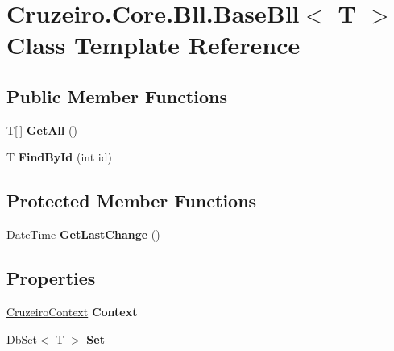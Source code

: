 \hypertarget{class_cruzeiro_1_1_core_1_1_bll_1_1_base_bll}{}\section{Cruzeiro.\+Core.\+Bll.\+Base\+Bll$<$ T $>$ Class Template Reference}
\label{class_cruzeiro_1_1_core_1_1_bll_1_1_base_bll}
\subsection*{Public Member Functions}
\begin{DoxyCompactItemize}
\item 
T\mbox{[}$\,$\mbox{]} {\bfseries Get\+All} ()\hypertarget{class_cruzeiro_1_1_core_1_1_bll_1_1_base_bll_aa5790d4f741afb0b0f5a05466eec2554}{}\label{class_cruzeiro_1_1_core_1_1_bll_1_1_base_bll_aa5790d4f741afb0b0f5a05466eec2554}

\item 
T {\bfseries Find\+By\+Id} (int id)\hypertarget{class_cruzeiro_1_1_core_1_1_bll_1_1_base_bll_ad104f483e8e7ceea014b4fabcae04562}{}\label{class_cruzeiro_1_1_core_1_1_bll_1_1_base_bll_ad104f483e8e7ceea014b4fabcae04562}

\end{DoxyCompactItemize}
\subsection*{Protected Member Functions}
\begin{DoxyCompactItemize}
\item 
Date\+Time {\bfseries Get\+Last\+Change} ()\hypertarget{class_cruzeiro_1_1_core_1_1_bll_1_1_base_bll_a5ade078b53054bb1e31be528e35c9f12}{}\label{class_cruzeiro_1_1_core_1_1_bll_1_1_base_bll_a5ade078b53054bb1e31be528e35c9f12}

\end{DoxyCompactItemize}
\subsection*{Properties}
\begin{DoxyCompactItemize}
\item 
\hyperlink{class_cruzeiro_1_1_core_1_1_model_1_1_context_1_1_cruzeiro_context}{Cruzeiro\+Context} {\bfseries Context}\hypertarget{class_cruzeiro_1_1_core_1_1_bll_1_1_base_bll_a1821dd13bfb7c6525737b0212e88d766}{}\label{class_cruzeiro_1_1_core_1_1_bll_1_1_base_bll_a1821dd13bfb7c6525737b0212e88d766}

\item 
Db\+Set$<$ T $>$ {\bfseries Set}\hypertarget{class_cruzeiro_1_1_core_1_1_bll_1_1_base_bll_aa6807d74b51261ca7f9574680685b3d7}{}\label{class_cruzeiro_1_1_core_1_1_bll_1_1_base_bll_aa6807d74b51261ca7f9574680685b3d7}

\end{DoxyCompactItemize}


